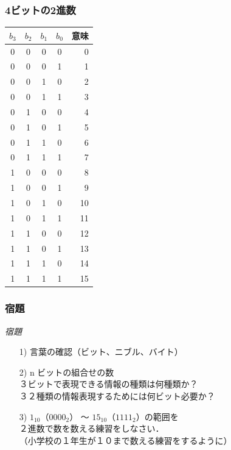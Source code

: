 \documentclass{beamer}                 %
\begin{document}
\begin{frame}
  \frametitle{4ビットの2進数}
  \begin{center}
    {\small\begin{tabular}{c|c|c|c|r}
      \hline\hline
      $b_3$ & $b_2$ & $b_1$ & $b_0$ & 意味\\
      \hline
      0 &  0 &  0 &  0 &  0 \\
      0 &  0 &  0 &  1 &  1 \\
      0 &  0 &  1 &  0 &  2 \\
      0 &  0 &  1 &  1 &  3 \\
      0 &  1 &  0 &  0 &  4 \\
      0 &  1 &  0 &  1 &  5 \\
      0 &  1 &  1 &  0 &  6 \\
      0 &  1 &  1 &  1 &  7 \\
      1 &  0 &  0 &  0 &  8 \\
      1 &  0 &  0 &  1 &  9 \\
      1 &  0 &  1 &  0 & 10 \\
      1 &  0 &  1 &  1 & 11 \\
      1 &  1 &  0 &  0 & 12 \\
      1 &  1 &  0 &  1 & 13 \\
      1 &  1 &  1 &  0 & 14 \\
      1 &  1 &  1 &  1 & 15 \\
    \end{tabular}}
  \end{center}
\end{frame}

\begin{frame}
  \frametitle{宿題}

\emph{宿題}
\begin{enumerate}
\item[1)] 言葉の確認（ビット、ニブル、バイト）
\vfill
\item[2)] n ビットの組合せの数 \\
  ３ビットで表現できる情報の種類は何種類か？ \\
  ３２種類の情報表現するためには何ビット必要か？
\vfill
\item[3)] $1_{10}$（$0000_2$） 〜 $15_{10}$（$1111_2$）の範囲を \\
  ２進数で数を数える練習をしなさい．\\
  （小学校の１年生が１０まで数える練習をするように）
\vfill
\end{enumerate}
\end{frame}
\end{document}
